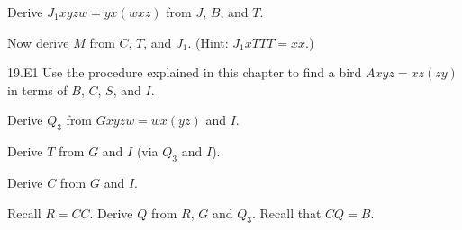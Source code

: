 \documentclass[12pt, letterpaper]{article}
\begin{document}
\begin{prob}{19.6}  
Derive $J_1xyzw = yx(wxz)$ from $J$, $B$, and $T$.
\end{prob}

\begin{prob}{19.7}  
Now derive $M$ from $C$, $T$, and $J_1$. (Hint: $J_1xTTT = xx$.)
\end{prob}

\begin{prob}{19.E1} 
Use the procedure explained in this chapter to find a bird $Axyz = xz(zy)$ in terms of $B$, $C$, $S$, and $I$.
\end{prob}

\begin{prob}{20.1}  
Derive $Q_3$ from $Gxyzw = wx(yz)$ and $I$.
\end{prob}

\begin{prob}{20.2}  
Derive $T$ from $G$ and $I$ (via $Q_3$ and $I$).
\end{prob}

\begin{prob}{20.3}  
Derive $C$ from $G$ and $I$.
\end{prob}

\begin{prob}{20.4}  
Recall $R = CC$. Derive $Q$ from $R$, $G$ and $Q_3$. Recall that $CQ = B$.
\end{prob}
\end{document}
